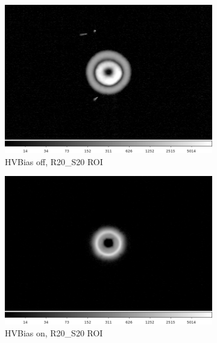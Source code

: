 \begin{figure}[!htbp]
\begin{subfigure}{0.35\textwidth}
     \includegraphics[width=\textwidth]{figures/phosphorescence-survey/hvbias_comp_R20_S20_off.png}
     \caption{HVBias off, R20\_S20 ROI}
     \label{subfig:hvb_off_R20_S20}
 \end{subfigure}
 \begin{subfigure}{0.35\textwidth}
     \includegraphics[width=\textwidth]{figures/phosphorescence-survey/hvbias_comp_R20_S20_on.png}
     \caption{HVBias on, R20\_S20 ROI}
     \label{subfig:hvb_on_R20_S20}
 \end{subfigure}
 \newline
 \begin{subfigure}{0.35\textwidth}

\end{subfigure}
\end{figure}
